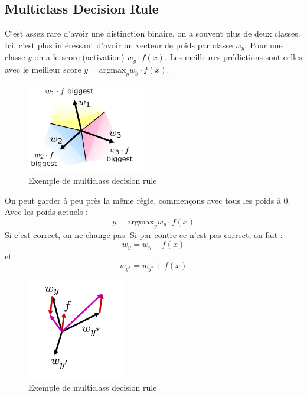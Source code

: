 \subsection{Multiclass Decision Rule}
\label{sub:multiclass_decision_rule}
C'est assez rare d'avoir une distinction binaire, on a souvent plus de deux classes. Ici, c'est plus intéressant d'avoir 
un vecteur de poids par classe $w_y$. Pour une classe $y$ on a le score (activation) $w_y\cdot f(x)$. Les meilleures prédictions
sont celles avec le meilleur score $y=\text{argmax}_{y} w_{y}\cdot f(x)$.
\begin{figure}[H]
    \centering
    \includegraphics[scale=0.6]{pictures/multiclass_perceptron.png}
    \caption{Exemple de multiclass decision rule}
\end{figure}
\begin{example}
    On peut garder à peu près la même règle, commençons avec tous les poids à 0. Avec les poids actuels :
    \begin{equation*}
        y = \text{argmax}_{y} w_{y}\cdot f(x)
    \end{equation*}
    Si c'est correct, on ne change pas. Si par contre ce n'est pas correct, on fait :
    \begin{equation*}
        w_y = w_y - f(x)
    \end{equation*}
    et
    \begin{equation*}
        w_{y^*} = w_{y^*} + f(x)
    \end{equation*}
    \begin{figure}[H]
        \centering
        \includegraphics[scale=0.6]{pictures/mutliclass_example.png}
        \caption{Exemple de multiclass decision rule}
    \end{figure}
\end{example}

